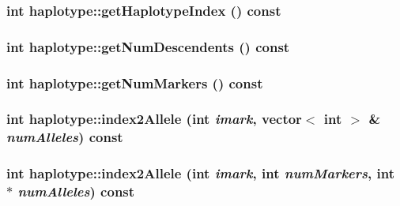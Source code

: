 \label{classhaplotype_ae5af7d8a6f4b65d0bdd705f6e1086203}
\hypertarget{classhaplotype_af843dcdcb8417a6cd0da7518e149f5c4}{
\subsubsection[{getHaplotypeIndex}]{\setlength{\rightskip}{0pt plus 5cm}int haplotype::getHaplotypeIndex () const}}
\label{classhaplotype_af843dcdcb8417a6cd0da7518e149f5c4}
\hypertarget{classhaplotype_a32e5fba880989c2e9524a0319263221c}{
\subsubsection[{getNumDescendents}]{\setlength{\rightskip}{0pt plus 5cm}int haplotype::getNumDescendents () const}}
\label{classhaplotype_a32e5fba880989c2e9524a0319263221c}
\hypertarget{classhaplotype_a7bcedee62c18d3b06750b86413798af0}{
\subsubsection[{getNumMarkers}]{\setlength{\rightskip}{0pt plus 5cm}int haplotype::getNumMarkers () const}}
\label{classhaplotype_a7bcedee62c18d3b06750b86413798af0}
\hypertarget{classhaplotype_ae473fca152c95fe3a85cfa97f74cdd92}{
\subsubsection[{index2Allele}]{\setlength{\rightskip}{0pt plus 5cm}int haplotype::index2Allele (int {\em imark}, \/  vector$<$ int $>$ \& {\em numAlleles}) const}}
\label{classhaplotype_ae473fca152c95fe3a85cfa97f74cdd92}
\hypertarget{classhaplotype_a863464fe488a5dc02f31a4c82c960ff5}{
\subsubsection[{index2Allele}]{\setlength{\rightskip}{0pt plus 5cm}int haplotype::index2Allele (int {\em imark}, \/  int {\em numMarkers}, \/  int $\ast$ {\em numAlleles}) const}}
